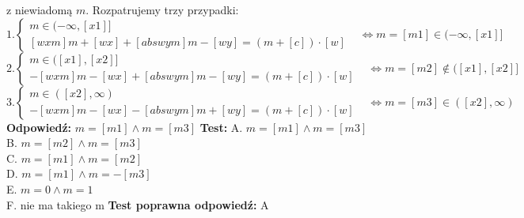 \documentclass[12pt, a4paper]{article}
\theoremstyle{definition} %
\newcommand{\rozwStop}{\newline}                                            %
\newcommand{\odpStart}{\noindent \textbf{Odpowiedź:}\newline}    %
\newcommand{\odpStop}{\newline}                                             %
\newcommand{\testStart}{\noindent \textbf{Test:}\newline} %
\newcommand{\testStop}{\newline} %
\newcommand{\kluczStart}{\noindent \textbf{Test poprawna odpowiedź:}\newline} %
\newcommand{\kluczStop}{\newline} %
\begin{document}
z niewiadomą $m$. Rozpatrujemy trzy przypadki:
$$
1. \left\{ \begin{array}{ll}
m\in(-\infty,[x1]] & \\
{[wxm]}m+[wx]+[abswym]m-[wy]=(m+[c])\cdot[w]  
\end{array} \right. \Leftrightarrow m=[m1]\in(-\infty,[x1]] 
$$
$$
2. \left\{ \begin{array}{ll}
m\in([x1],[x2]] & \\
-[wxm]m-[wx]+[abswym]m-[wy]=(m+[c])\cdot[w]  
\end{array} \right. \Leftrightarrow m=[m2]\notin([x1],[x2]]
$$
$$
3. \left\{ \begin{array}{ll}
m\in([x2],\infty) & \\
-[wxm]m-[wx]-[abswym]m+[wy]=(m+[c])\cdot[w]  
\end{array} \right. \Leftrightarrow m=[m3]\in([x2],\infty)
$$
\rozwStop
\odpStart
$m=[m1]\wedge m=[m3]$
\odpStop
\testStart
A. $m=[m1]\wedge m=[m3]$\\
B. $m=[m2]\wedge m=[m3]$\\
C. $m=[m1]\wedge m=[m2]$\\
D. $m=[m1]\wedge m=-[m3]$\\
E. $m=0\wedge m=1$\\
F. nie ma takiego m 
\testStop
\kluczStart
A
\kluczStop
\end{document}
